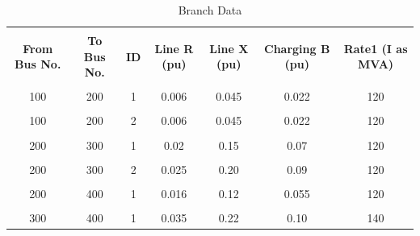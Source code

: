 \documentclass[paper=a4, fontsize=11pt]{article}
\begin{document}
\begin{table}[h]
\caption{Branch Data}
\centering
\begin{tabular}{|c|c|c|c|c|c|c|}
\hline &&&&&&\\[-1em]
\textbf{From Bus No.} & \textbf{To Bus No.} & \textbf{ID} & \textbf{Line R (pu)} & \textbf{Line X (pu)} & \textbf{Charging B (pu)} & \textbf{Rate1 (I as MVA)} \\ \hline &&&&&&\\[-1em]
100                   & 200                 & 1           & 0.006                & 0.045                & 0.022                    & 120                       \\ \hline &&&&&&\\[-1em]
100                   & 200                 & 2           & 0.006                & 0.045                & 0.022                    & 120                       \\ \hline &&&&&&\\[-1em]
200                   & 300                 & 1           & 0.02                 & 0.15                 & 0.07                     & 120                       \\ \hline &&&&&&\\[-1em]
200                   & 300                 & 2           & 0.025                & 0.20                 & 0.09                     & 120                       \\ \hline &&&&&&\\[-1em]
200                   & 400                 & 1           & 0.016                & 0.12                 & 0.055                    & 120                       \\ \hline &&&&&&\\[-1em]
300                   & 400                 & 1           & 0.035                & 0.22                 & 0.10                     & 140                       \\ \hline
\end{tabular}
\label{table:3}
\end{table}
\end{document}
